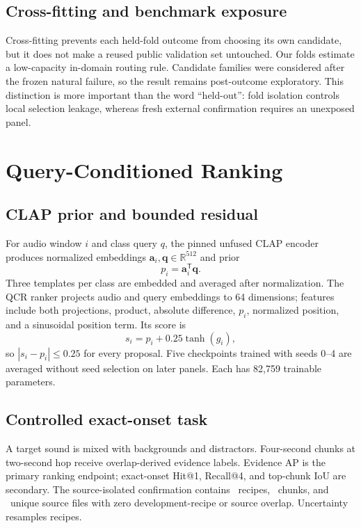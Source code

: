 \documentclass[journal,10pt]{IEEEtran}
\begin{document}
\subsection{Cross-fitting and benchmark exposure}
Cross-fitting prevents each held-fold outcome from choosing its own
candidate, but it does not make a reused public validation set untouched.
Our folds estimate a low-capacity in-domain routing rule. Candidate families
were considered after the frozen natural failure, so the result remains
post-outcome exploratory. This distinction is more important than the word
``held-out'': fold isolation controls local selection leakage, whereas fresh
external confirmation requires an unexposed panel.

\section{Query-Conditioned Ranking}
\subsection{CLAP prior and bounded residual}
For audio window $i$ and class query $q$, the pinned unfused CLAP encoder
produces normalized embeddings $\mathbf a_i,\mathbf q\in\mathbb R^{512}$ and
prior
\begin{equation}
p_i=\mathbf a_i^\mathsf{T}\mathbf q.
\end{equation}
Three templates per class are embedded and averaged after normalization. The
QCR ranker projects audio and query embeddings to 64 dimensions; features
include both projections, product, absolute difference, $p_i$, normalized
position, and a sinusoidal position term. Its score is
\begin{equation}
s_i=p_i+0.25\tanh(g_i),
\label{eq:qcr}
\end{equation}
so $|s_i-p_i|\le0.25$ for every proposal. Five checkpoints trained with seeds
0--4 are averaged without seed selection on later panels. Each has 82,759
trainable parameters.

\subsection{Controlled exact-onset task}
A target sound is mixed with backgrounds and distractors. Four-second chunks
at two-second hop receive overlap-derived evidence labels. Evidence AP is the
primary ranking endpoint; exact-onset Hit@1, Recall@4, and top-chunk IoU are
secondary. The source-isolated confirmation contains \ControlledN\ recipes,
\ControlledChunks\ chunks, and \ControlledSources\ unique source files with
zero development-recipe or source overlap. Uncertainty resamples recipes.
\end{document}
